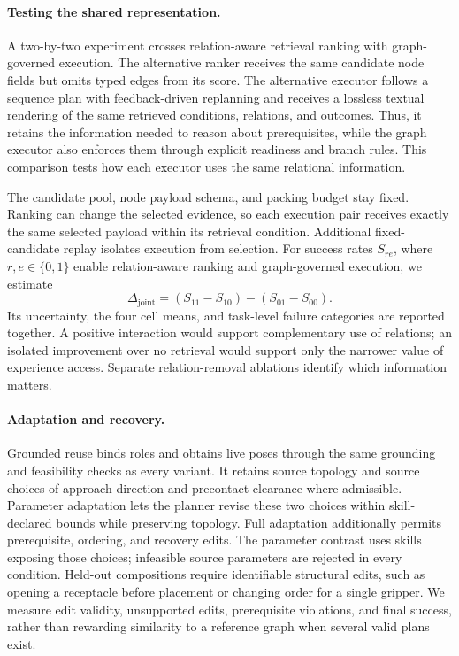 \paragraph{Testing the shared representation.}
A two-by-two experiment crosses relation-aware retrieval ranking with graph-governed execution. The alternative ranker receives the same candidate node fields but omits typed edges from its score. The alternative executor follows a sequence plan with feedback-driven replanning and receives a lossless textual rendering of the same retrieved conditions, relations, and outcomes. Thus, it retains the information needed to reason about prerequisites, while the graph executor also enforces them through explicit readiness and branch rules. This comparison tests how each executor uses the same relational information.

The candidate pool, node payload schema, and packing budget stay fixed. Ranking can change the selected evidence, so each execution pair receives exactly the same selected payload within its retrieval condition. Additional fixed-candidate replay isolates execution from selection. For success rates $S_{re}$, where $r,e\in\{0,1\}$ enable relation-aware ranking and graph-governed execution, we estimate
\begin{equation}
\Delta_{\mathrm{joint}}=(S_{11}-S_{10})-(S_{01}-S_{00}).
\end{equation}
Its uncertainty, the four cell means, and task-level failure categories are reported together. A positive interaction would support complementary use of relations; an isolated improvement over no retrieval would support only the narrower value of experience access. Separate relation-removal ablations identify which information matters.

\paragraph{Adaptation and recovery.}
Grounded reuse binds roles and obtains live poses through the same grounding and feasibility checks as every variant. It retains source topology and source choices of approach direction and precontact clearance where admissible. Parameter adaptation lets the planner revise these two choices within skill-declared bounds while preserving topology. Full adaptation additionally permits prerequisite, ordering, and recovery edits. The parameter contrast uses skills exposing those choices; infeasible source parameters are rejected in every condition. Held-out compositions require identifiable structural edits, such as opening a receptacle before placement or changing order for a single gripper. We measure edit validity, unsupported edits, prerequisite violations, and final success, rather than rewarding similarity to a reference graph when several valid plans exist.

